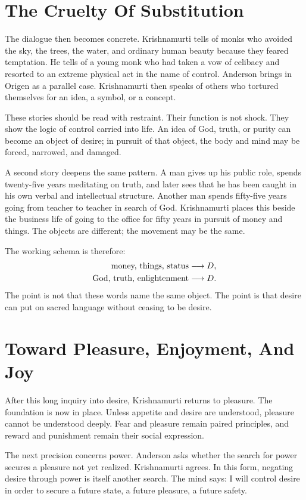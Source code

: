 \section{The Cruelty Of Substitution}

The dialogue then becomes concrete. Krishnamurti tells of monks who avoided the sky, the trees, the water, and ordinary human beauty because they feared temptation. He tells of a young monk who had taken a vow of celibacy and resorted to an extreme physical act in the name of control. Anderson brings in Origen as a parallel case. Krishnamurti then speaks of others who tortured themselves for an idea, a symbol, or a concept.

These stories should be read with restraint. Their function is not shock. They show the logic of control carried into life. An idea of God, truth, or purity can become an object of desire; in pursuit of that object, the body and mind may be forced, narrowed, and damaged.

A second story deepens the same pattern. A man gives up his public role, spends twenty-five years meditating on truth, and later sees that he has been caught in his own verbal and intellectual structure. Another man spends fifty-five years going from teacher to teacher in search of God. Krishnamurti places this beside the business life of going to the office for fifty years in pursuit of money and things. The objects are different; the movement may be the same.

The working schema is therefore:
\begin{align}
\hbox{money, things, status} &\longrightarrow D,\\
\hbox{God, truth, enlightenment} &\longrightarrow D.
\end{align}
The point is not that these words name the same object. The point is that desire can put on sacred language without ceasing to be desire.

\section{Toward Pleasure, Enjoyment, And Joy}

After this long inquiry into desire, Krishnamurti returns to pleasure. The foundation is now in place. Unless appetite and desire are understood, pleasure cannot be understood deeply. Fear and pleasure remain paired principles, and reward and punishment remain their social expression.

The next precision concerns power. Anderson asks whether the search for power secures a pleasure not yet realized. Krishnamurti agrees. In this form, negating desire through power is itself another search. The mind says: I will control desire in order to secure a future state, a future pleasure, a future safety.

